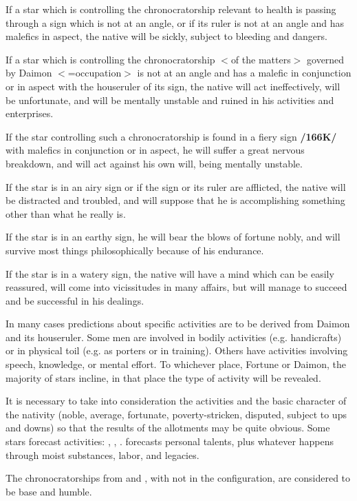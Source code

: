 If a star which is controlling the chronocratorship relevant to health is passing through a sign which is not at an angle, or if its ruler is not at an angle and has malefics in aspect, the native will be sickly, subject to bleeding and dangers. 

If a star which is controlling the chronocratorship $<$of the matters$>$ governed by Daimon $<$=occupation$>$ is not at an angle and has a malefic in conjunction or in aspect with the houseruler of its sign, the native will act ineffectively, will be unfortunate, and will be mentally unstable and ruined in
his activities and enterprises. 

If the star controlling such a chronocratorship is found in a fiery sign \textbf{/166K/} with malefics in conjunction or in aspect, he will suffer a great nervous breakdown, and will act against his own will, being mentally unstable. 

If the star is in an airy sign or if the sign or its ruler are afflicted, the native will be distracted and troubled, and will suppose that he is accomplishing something other than what he really is. 

If the star is in an earthy sign, he will bear the blows of fortune nobly, and will survive most things philosophically because of his endurance. 

If the star is in a watery sign, the native will have a mind which can be easily reassured, will come into vicissitudes in many affairs, but will manage to succeed and be successful in his dealings.

In many cases predictions about specific activities are to be derived from Daimon and its houseruler. Some men are involved in bodily activities (e.g. handicrafts) or in physical toil (e.g. as porters or in training). Others have activities involving speech, knowledge, or mental effort. To whichever place, Fortune or Daimon, the majority of stars incline, in that place the type of activity will be revealed. 

It is necessary to take into consideration the activities and the basic character of the nativity (noble, average, fortunate, poverty-stricken, disputed, subject to ups and downs) so that the results of the allotments may be quite obvious. Some stars forecast activities: \Mars, \Venus, \Mercury. \Saturn\xspace forecasts personal talents, plus whatever happens through moist substances, labor, and legacies. 

The chronocratorships from \Saturn\xspace and \Mars, with \Jupiter\xspace not in the configuration, are considered to be base and humble. 

